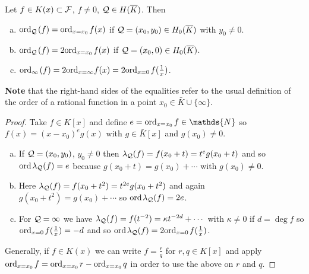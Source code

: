 \documentclass[english,11pt,a4paper]{article}
\begin{document}
\begin{lemma}\label{two}
  Let $f \in K(x) \subset \mathcal{F}$, $f \neq 0$, $\mathcal{Q} \in H(\overline K)$. Then
  \begin{enumerate}[(a)]\parskip 1mm
    \item $\text{ord}_{\mathcal{Q}}\hspace{0.4mm} (f) = \text{ord}_{x=x_0}\hspace{0.4mm} f(x)$ if $\mathcal{Q} = (x_0,y_0) \in H_0(\overline K)$ with $y_0 \neq 0$.
    \item $\text{ord}_{\mathcal{Q}}\hspace{0.4mm} (f) = 2 \text{ord}_{x=x_0}\hspace{0.4mm} f(x)$ if $\mathcal{Q} = (x_0,0) \in H_0(\overline K)$.
    \item $\text{ord}_{\infty}\hspace{0.4mm} (f) = 2 \text{ord}_{x=\infty} f(x) = 2 \text{ord}_{x=0}\hspace{0.4mm} f(\frac 1 x)$.
  \end{enumerate}\parskip 3mm
  \textbf{Note} that the right-hand sides of the equalities refer to the usual definition of the order of a rational function in a point $x_0 \in \bar K \cup \{ \infty \}$.%
  \begin{proof}
    Take $f \in K[x]$ and define $e = \ordx f \in \mathds{N}$ so $f(x) = (x-x_0)^e g(x)$ with $g \in \bar K[x]$ and $g(x_0)\neq 0$.
    \begin{enumerate}[(a)]
      \item If $\mathcal{Q} =(x_0,y_0)$, $y_0 \neq 0$ then $\lambda_{\mathcal{Q}} (f) = f(x_0 + t) = t^e g(x_0 + t)$ and so $\text{ord\hspace{0.4mm}} \lambda_{\mathcal{Q}} (f) = e$ because $g(x_0 + t) = g(x_0) + \cdots$ with $g(x_0) \neq 0$.

      \item Here $\lambda_{\mathcal{Q}} (f) = f(x_0 + t^2) = t^{2e} g(x_0 + t^2)$ and again $g(x_0 + t^2) = g(x_0) + \cdots$ so $\text{ord\hspace{0.4mm}} \lambda_{\mathcal{Q}} (f) = 2e$.

      \item For $\mathcal{Q} = \infty$ we have $\lambda_{\mathcal{Q}} (f) = f(t^{-2}) = \kappa t^{-2d}+ \cdots$ with $\kappa \neq 0$ if $d = \deg f$ so $\text{ord}_{x=0}\hspace{0.4mm} f(\frac 1 x ) = -d$ and so $\text{ord\hspace{0.4mm}} \lambda_{\mathcal{Q}} (f) = 2 \text{ord}_{x=0}\hspace{0.4mm} f(\frac 1 x )$.
    \end{enumerate}
    Generally, if $f \in K(x)$ we can write $f = \frac r q$ for $r, q \in K[x]$ and apply $\text{ord}_{x=x_0}\hspace{0.4mm} f = \text{ord}_{x=x_0}\hspace{0.4mm} r - \text{ord}_{x=x_0}\hspace{0.4mm} q$ in order to use the above on $r$ and $q$. %
  \end{proof}
\end{lemma}
\end{document}
